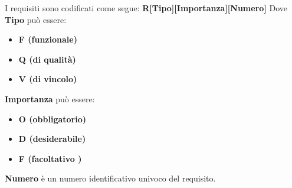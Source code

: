 I requisiti sono codificati come segue: \textbf{R[Tipo][Importanza][Numero]}
\newline
Dove \textbf{Tipo} può essere:
\begin{itemize}
    \item \textbf{F (funzionale)}
    \item \textbf{Q (di qualità)}
    \item \textbf{V (di vincolo)}
\end{itemize}
\textbf{Importanza} può essere:
\begin{itemize}
    \item \textbf{O (obbligatorio)}
    \item \textbf{D (desiderabile)}
    \item \textbf{F (facoltativo )}
\end{itemize}
\textbf{Numero} è un numero identificativo univoco del requisito.

